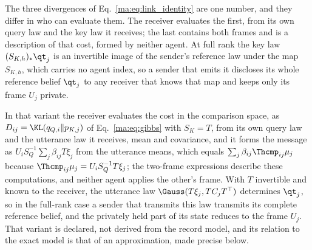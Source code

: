 
The three divergences of Eq.~\eqref{ma:eq:link_identity} are one number, and they differ in who can evaluate them. The receiver evaluates the first, from its own query law and the key law it receives; the last contains both frames and is a description of that cost, formed by neither agent. At full rank the key law $(S_{K,h})_*\qt_j$ is an invertible image of the sender's reference law under the map $S_{K,h}$, which carries no agent index, so a sender that emits it discloses its whole reference belief $\qt_j$ to any receiver that knows that map and keeps only its frame $U_j$ private.

In that variant the receiver evaluates the cost in the comparison space, as $D_{ij}=\KL(q_{Q,i}\|p_{K,j})$ of Eq.~\eqref{ma:eq:gibbs} with $S_K=T$, from its own query law and the utterance law it receives, mean and covariance, and it forms the message as $U_iS_Q^{-1}\sum_j\beta_{ij}T\xi_j$ from the utterance means, which equals $\sum_j\beta_{ij}\Thcmp_{ij}\mu_j$ because $\Thcmp_{ij}\mu_j=U_iS_Q^{-1}T\xi_j$; the two-frame expressions describe these computations, and neither agent applies the other's frame. With $T$ invertible and known to the receiver, the utterance law $\Gauss(T\xi_j,TC_jT^\top)$ determines $\qt_j$, so in the full-rank case a sender that transmits this law transmits its complete reference belief, and the privately held part of its state reduces to the frame $U_j$. That variant is declared, not derived from the record model, and its relation to the exact model is that of an approximation, made precise below.

